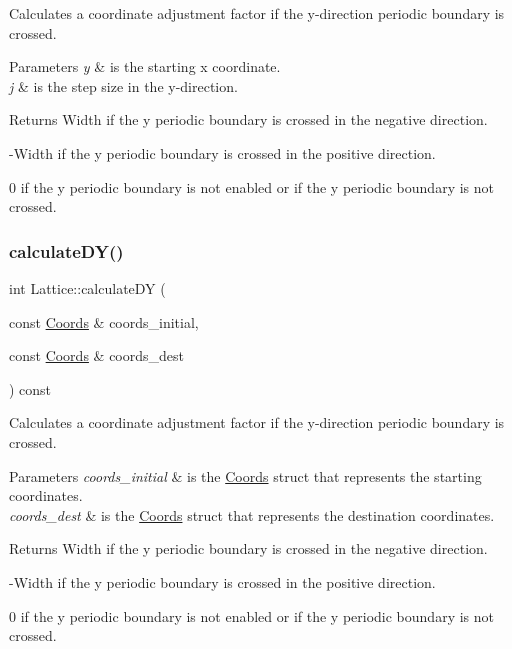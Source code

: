 Calculates a coordinate adjustment factor if the y-\/direction periodic boundary is crossed. 


\begin{DoxyParams}{Parameters}
{\em y} & is the starting x coordinate. \\
\hline
{\em j} & is the step size in the y-\/direction. \\
\hline
\end{DoxyParams}
\begin{DoxyReturn}{Returns}
Width if the y periodic boundary is crossed in the negative direction. 

-\/\+Width if the y periodic boundary is crossed in the positive direction. 

0 if the y periodic boundary is not enabled or if the y periodic boundary is not crossed. 
\end{DoxyReturn}
\mbox{\label{class_lattice_a4e8b3577701ec0cefce595f6956b22e3}} 
\subsubsection{\texorpdfstring{calculate\+D\+Y()}{calculateDY()}\hspace{0.1cm}{\footnotesize\ttfamily [2/2]}}
{\footnotesize\ttfamily int Lattice\+::calculate\+DY (\begin{DoxyParamCaption}\item[{const \hyperlink{struct_coords}{Coords} \&}]{coords\+\_\+initial,  }\item[{const \hyperlink{struct_coords}{Coords} \&}]{coords\+\_\+dest }\end{DoxyParamCaption}) const}



Calculates a coordinate adjustment factor if the y-\/direction periodic boundary is crossed. 


\begin{DoxyParams}{Parameters}
{\em coords\+\_\+initial} & is the \hyperlink{struct_coords}{Coords} struct that represents the starting coordinates. \\
\hline
{\em coords\+\_\+dest} & is the \hyperlink{struct_coords}{Coords} struct that represents the destination coordinates. \\
\hline
\end{DoxyParams}
\begin{DoxyReturn}{Returns}
Width if the y periodic boundary is crossed in the negative direction. 

-\/\+Width if the y periodic boundary is crossed in the positive direction. 

0 if the y periodic boundary is not enabled or if the y periodic boundary is not crossed. 
\end{DoxyReturn}
\mbox{\label{class_lattice_a584ff9c528ebe46a6aea6ed652d107f4}} 
